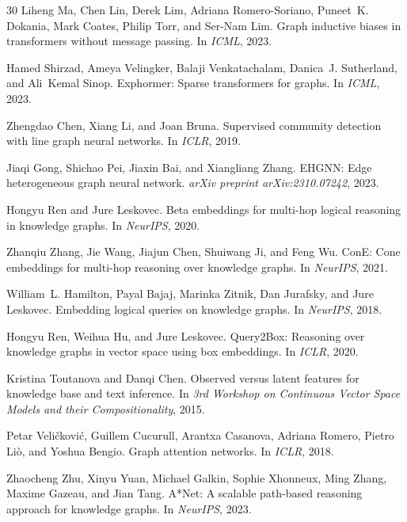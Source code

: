 \documentclass{article}
\begin{document}
\begin{thebibliography}{30}
Liheng Ma, Chen Lin, Derek Lim, Adriana Romero-Soriano, Puneet~K. Dokania, Mark Coates, Philip Torr, and Ser-Nam Lim.
\newblock Graph inductive biases in transformers without message passing.
\newblock In \emph{ICML}, 2023.

Hamed Shirzad, Ameya Velingker, Balaji Venkatachalam, Danica~J. Sutherland, and Ali~Kemal Sinop.
\newblock Exphormer: Sparse transformers for graphs.
\newblock In \emph{ICML}, 2023.

Zhengdao Chen, Xiang Li, and Joan Bruna.
\newblock Supervised community detection with line graph neural networks.
\newblock In \emph{ICLR}, 2019.

Jiaqi Gong, Shichao Pei, Jiaxin Bai, and Xiangliang Zhang.
\newblock EHGNN: Edge heterogeneous graph neural network.
\newblock \emph{arXiv preprint arXiv:2310.07242}, 2023.

Hongyu Ren and Jure Leskovec.
\newblock Beta embeddings for multi-hop logical reasoning in knowledge graphs.
\newblock In \emph{NeurIPS}, 2020.

Zhanqiu Zhang, Jie Wang, Jiajun Chen, Shuiwang Ji, and Feng Wu.
\newblock ConE: Cone embeddings for multi-hop reasoning over knowledge graphs.
\newblock In \emph{NeurIPS}, 2021.

William~L. Hamilton, Payal Bajaj, Marinka Zitnik, Dan Jurafsky, and Jure Leskovec.
\newblock Embedding logical queries on knowledge graphs.
\newblock In \emph{NeurIPS}, 2018.

Hongyu Ren, Weihua Hu, and Jure Leskovec.
\newblock Query2Box: Reasoning over knowledge graphs in vector space using box embeddings.
\newblock In \emph{ICLR}, 2020.

Kristina Toutanova and Danqi Chen.
\newblock Observed versus latent features for knowledge base and text inference.
\newblock In \emph{3rd Workshop on Continuous Vector Space Models and their Compositionality}, 2015.

Petar Veli{\v{c}}kovi{\'c}, Guillem Cucurull, Arantxa Casanova, Adriana Romero, Pietro Li{\`o}, and Yoshua Bengio.
\newblock Graph attention networks.
\newblock In \emph{ICLR}, 2018.

Zhaocheng Zhu, Xinyu Yuan, Michael Galkin, Sophie Xhonneux, Ming Zhang, Maxime Gazeau, and Jian Tang.
\newblock A*Net: A scalable path-based reasoning approach for knowledge graphs.
\newblock In \emph{NeurIPS}, 2023.



\end{thebibliography}
\end{document}
